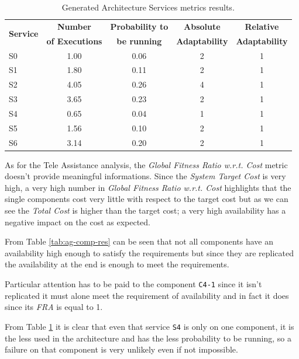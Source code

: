 \begin{table}[ht!b]
	\centering
	\begin{tabular}{|l|c|c|c|c|}
		\hline 
		\multirow{2}{*}{\textbf{Service}} & \textbf{Number} & \textbf{Probability to} & \textbf{Absolute} & \textbf{Relative} \\ 
		& \textbf{of Executions} & \textbf{be running} & \textbf{Adaptability} & \textbf{Adaptability} \\
		\hline 
		S0 & 1.00 & 0.06 & 2 & 1 \\
		\hline 
		S1 & 1.80 & 0.11 & 2 & 1 \\
		\hline 
		S2 & 4.05 & 0.26 & 4 & 1 \\
		\hline 
		S3 & 3.65 & 0.23 & 2 & 1 \\
		\hline
		S4 & 0.65 & 0.04 & 1 & 1 \\
		\hline
		S5 & 1.56 & 0.10 & 2 & 1 \\
		\hline
		S6 & 3.14 & 0.20 & 2 & 1 \\
		\hline
	\end{tabular} 
	\caption[Generated Architecture Service Services Metrics]{Generated Architecture Services metrics results.}
	\label{tab:ag-serv-res}
\end{table}


As for the Tele Assistance analysis, the \emph{Global Fitness Ratio w.r.t. Cost} metric doesn't provide meaningful informations. Since the \emph{System Target Cost} is very high, a very high number in \emph{Global Fitness Ratio w.r.t. Cost} highlights that the single components cost very little with respect to the target cost but as we can see the \emph{Total Cost} is higher than the target cost; a very high availability has a negative impact on the cost as expected. 

From Table \ref{tab:ag-comp-res} can be seen that not all components have an availability high enough to satisfy the requirements but since they are replicated the availability at the end is enough to meet the requirements.

Particular attention has to be paid to the component \texttt{C4-1} since it isn't replicated it must alone meet the requirement of availability and in fact it does since its \emph{FRA} is equal to 1.

From Table \ref{tab:ag-serv-res} it is clear that even that service \texttt{S4} is only on one component, it is the less used in the architecture and has the less probability to be running, so a failure on that component is very unlikely even if not impossible.

